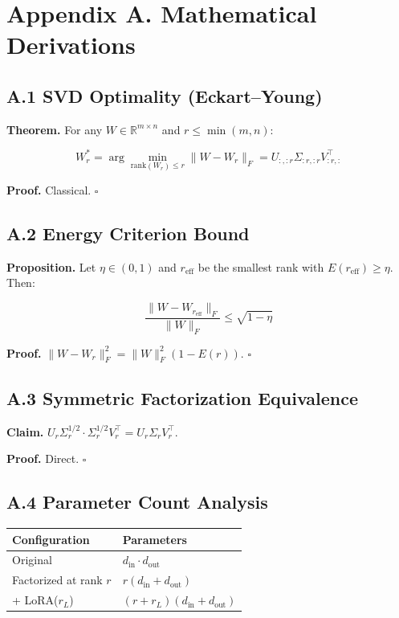 
\section{Appendix A. Mathematical Derivations}

\subsection{A.1 SVD Optimality (Eckart--Young)}

\textbf{Theorem.} For any $W \in \mathbb{R}^{m \times n}$ and $r \leq \min(m, n)$:

\[
W_r^* = \arg\min_{\text{rank}(W_r) \leq r} \|W - W_r\|_F = U_{:, :r} \Sigma_{:r, :r} V_{:r, :}^\top
\tag{A.1}
\]

\textbf{Proof.} Classical. $\square$

\subsection{A.2 Energy Criterion Bound}

\textbf{Proposition.} Let $\eta \in (0, 1)$ and $r_\text{eff}$ be the smallest 
rank with $E(r_\text{eff}) \geq \eta$. Then:

\[
\frac{\|W - W_{r_\text{eff}}\|_F}{\|W\|_F} \leq \sqrt{1 - \eta}
\tag{A.2}
\]

\textbf{Proof.} $\|W - W_r\|_F^2 = \|W\|_F^2(1 - E(r))$. $\square$

\subsection{A.3 Symmetric Factorization Equivalence}

\textbf{Claim.} $U_r \Sigma_r^{1/2} \cdot \Sigma_r^{1/2} V_r^\top = U_r \Sigma_r V_r^\top$.

\textbf{Proof.} Direct. $\square$

\subsection{A.4 Parameter Count Analysis}

\begin{table}[H]
\centering
\small
\begin{tabular}{ll}
\toprule
\textbf{Configuration} & \textbf{Parameters} \\
\midrule
Original & $d_\text{in} \cdot d_\text{out}$ \\
Factorized at rank $r$ & $r(d_\text{in} + d_\text{out})$ \\
+ LoRA($r_L$) & $(r + r_L)(d_\text{in} + d_\text{out})$ \\
\bottomrule
\end{tabular}
\end{table}

